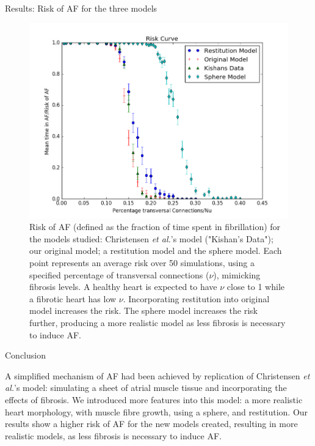 \documentclass[final,hyperref={pdfpagelabels=false}]{beamer}
\begin{document}
\begin{frame}[t]
\begin{columns}[t]
\begin{column}{.465\textwidth}
\begin{block}{Results: Risk of AF for the three models}
\begin{figure}
\includegraphics[width=0.65\linewidth]{xriskcurvesphere}
\caption{Risk of AF (defined as the fraction of time spent in fibrillation) for the models studied: Christensen \emph{et al.}'s model ("Kishan's Data"); our original model; a restitution model and the sphere model. Each point represents an average risk over 50 simulations, using a specified percentage of transversal connections ($\nu$), mimicking fibrosis levels. A healthy heart is expected to have $\nu$ close to 1 while a fibrotic heart has low $\nu$. Incorporating restitution into original model increases the risk. The sphere model increases the risk further, producing a more realistic model as less fibrosis is necessary to induce AF. }
\end{figure}

\end{block}


\begin{block}{Conclusion}

A simplified mechanism of AF had been achieved by replication of Christensen \emph{et al.}'s model: simulating a sheet of atrial muscle tissue and incorporating the effects of fibrosis. We introduced more features into this model: a more realistic heart morphology, with muscle fibre growth, using a sphere, and restitution. Our results show a higher risk of AF for the new models created, resulting in more realistic models, as less fibrosis is necessary to induce AF.
\end{block}



\end{column}
\end{columns}
\end{frame}
\end{document}
